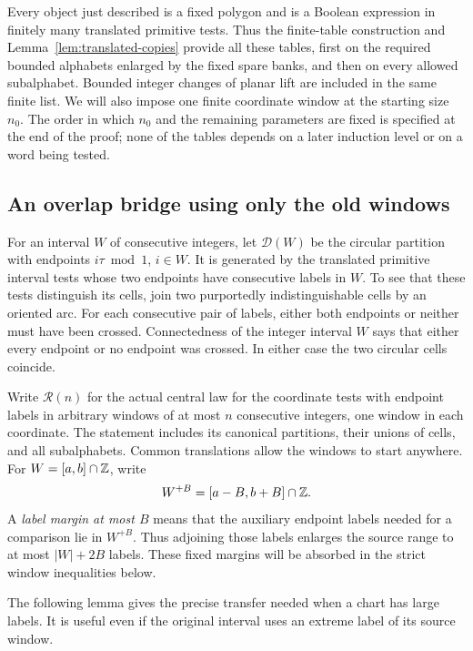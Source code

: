 Every object just described is a fixed polygon and is a Boolean
expression in finitely many translated primitive tests.  Thus the
finite-table construction and Lemma~\ref{lem:translated-copies} provide
all these tables, first on the required bounded alphabets enlarged by
the fixed spare banks, and then on every allowed subalphabet.  Bounded
integer changes of planar lift are included in the same finite list.
We will also impose one finite coordinate window at the starting size
$n_0$.  The order in which $n_0$ and the remaining parameters are fixed
is specified at the end of the proof; none of the tables depends on a
later induction level or on a word being tested.

\subsection{An overlap bridge using only the old windows}

For an interval $W$ of consecutive integers, let $\mathcal D(W)$ be
the circular partition with endpoints $i\tau\bmod1$, $i\in W$.
It is generated by the translated primitive interval tests whose two
endpoints have consecutive labels in $W$.  To see that these tests
distinguish its cells, join two purportedly indistinguishable cells by
an oriented arc.  For each consecutive pair of labels, either both
endpoints or neither must have been crossed.  Connectedness of the
integer interval $W$ says that either every endpoint or no endpoint
was crossed.  In either case the two circular cells coincide.

Write $\mathcal R(n)$ for the actual central law for the coordinate
tests with endpoint labels in arbitrary windows of at most $n$
consecutive integers, one window in each coordinate.  The statement
includes its canonical partitions, their unions of cells, and all
subalphabets.  Common translations allow the windows to start
anywhere.  For $W=[a,b]\cap\mathbb Z$, write
\[
 W^{+B}=[a-B,b+B]\cap\mathbb Z.
\]
A \emph{label margin at most $B$} means that the auxiliary endpoint
labels needed for a comparison lie in $W^{+B}$.  Thus adjoining those
labels enlarges the source range to at most $|W|+2B$ labels.  These
fixed margins will be absorbed in the strict window inequalities below.

The following lemma gives the precise transfer needed when a chart
has large labels.  It is useful even if the original interval uses
an extreme label of its source window.

